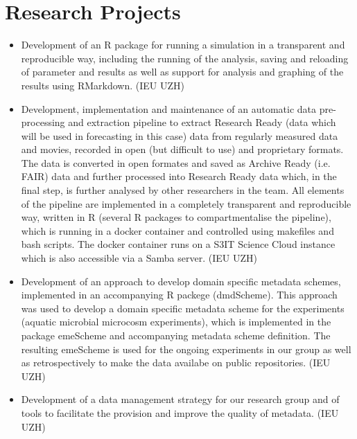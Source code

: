 \documentclass[a4paper]{article}
\begin{document}
\section{Research Projects}

\begin{itemize}[leftmargin=1.1in]

\item Development of an R package for running a simulation in a
	transparent and reproducible way, including the running of the
	analysis, saving and reloading of parameter and results as well as
	support for analysis and graphing of the results using RMarkdown. (IEU UZH)

\item Development, implementation and maintenance of an automatic data
	pre-processing and extraction pipeline to extract Research Ready
	(data which will be used in forecasting in this case) data from
	regularly measured data and movies, recorded in open (but
	difficult to use) and proprietary formats. The data is converted in
	open formates and saved as Archive Ready (i.e. FAIR) data and further
	processed into Research Ready data which, in the final step,  is
	further analysed by other researchers in the team. All elements of
	the pipeline are implemented in a completely transparent and
	reproducible way, written in R (several R packages to
	compartmentalise the pipeline), which is running in a docker
	container and controlled using makefiles and bash scripts. The docker
	container runs on a S3IT Science Cloud instance which is also
	accessible via a Samba server. (IEU UZH)

\item Development of an approach to develop domain specific metadata
	schemes, implemented in an accompanying R packege (dmdScheme). This
	approach was used to develop a domain specific metadata scheme for
	the experiments (aquatic microbial microcosm experiments), which is
	implemented in the package emeScheme and accompanying metadata scheme
	definition. The resulting emeScheme is used for the ongoing
	experiments in our group as well as retrospectively to make the data
	availabe on public repositories. (IEU UZH)

\item Development of a data management strategy for our research group
	and of tools to facilitate the provision and improve the quality of
	metadata. (IEU UZH)



\end{itemize}
\end{document}
